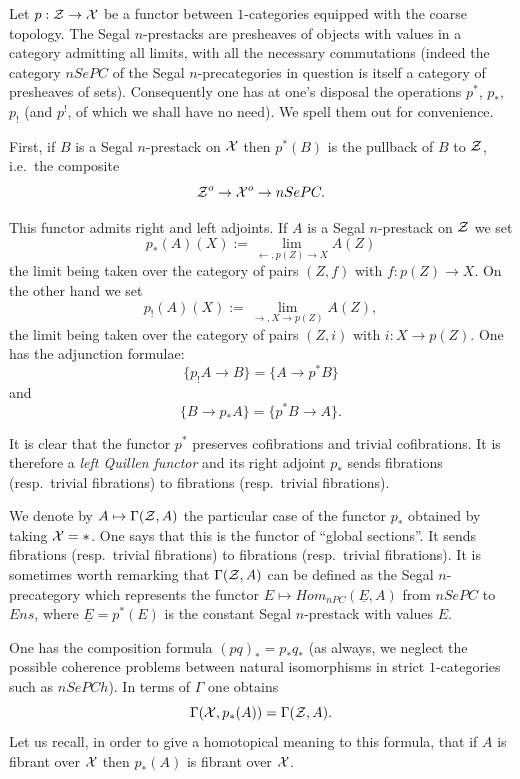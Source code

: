 Let $p: {\cal Z} \rightarrow {\cal X}$ be a functor between $1$-categories equipped with
the coarse topology. The Segal $n$-prestacks are presheaves of objects with
values in a category admitting all limits, with all the necessary commutations
(indeed the category $nSePC$ of the Segal $n$-precategories in question is
itself a category of presheaves of sets).
Consequently one has at one's disposal the operations $p^{\ast}$,
$p_{\ast}$, $p_!$ (and $p^!$, of which we shall have no need). We spell them
out for convenience.

First, if $B$ is a Segal $n$-prestack on ${\cal X}$ then $p^{\ast}(B)$ is the
pullback of $B$ to ${\cal Z}$, i.e.\ the composite
$$
{\cal Z} ^o \rightarrow {\cal X} ^o \rightarrow nSePC.
$$

This functor admits right and left adjoints. If $A$ is a Segal $n$-prestack on
${\cal Z}$ we set
$$
p_{\ast}(A)(X) := \lim _{\leftarrow , p(Z)\rightarrow X}A(Z)
$$
the limit being taken over the category of pairs $(Z, f)$ with
$f: p(Z)\rightarrow X$. On the other hand we set
$$
p_!(A)(X) := \lim _{\rightarrow , X\rightarrow p(Z)}A(Z),
$$
the limit being taken over the category of pairs $(Z, i)$ with
$i: X\rightarrow p(Z)$. One has the adjunction formulae:
$$
\{ p_!A\rightarrow B\} = \{ A\rightarrow p^{\ast} B\}
$$
and
$$
\{ B\rightarrow p_{\ast}A\} = \{ p^{\ast}B \rightarrow A\} .
$$

It is clear that the functor $p^{\ast}$ preserves cofibrations and trivial
cofibrations. It is therefore a {\em left Quillen functor} and its right
adjoint $p_{\ast}$ sends fibrations (resp.\ trivial fibrations) to fibrations
(resp.\ trivial fibrations).

We denote by $A\mapsto \Gamma ({\cal Z} , A)$ the particular case of the functor
$p_{\ast}$ obtained by taking ${\cal X} = \ast$. One says that this is the functor
of ``global sections''.
It
sends fibrations (resp.\ trivial fibrations) to fibrations (resp.\ trivial
fibrations).
It is sometimes worth remarking that $\Gamma ({\cal Z} , A)$ can be defined as the
Segal $n$-precategory which represents the functor
$E\mapsto Hom _{nPC}(\underline{E}, A)$ from $nSePC$ to $Ens$, where
$\underline{E} = p^{\ast}(E)$ is the constant Segal $n$-prestack with values
$E$.


One has the composition formula $(pq)_{\ast} = p_{\ast} q_{\ast}$ (as
always, we neglect the possible coherence problems between natural
isomorphisms in strict $1$-categories such as $nSePCh$). In terms of $\Gamma$
one obtains
$$
\Gamma ({\cal X} , p_{\ast}(A))=\Gamma ({\cal Z} , A).
$$
Let us recall, in order to give a homotopical meaning to this formula, that if
$A$ is fibrant over ${\cal X}$ then $p_{\ast}(A)$ is fibrant over ${\cal X}$.

